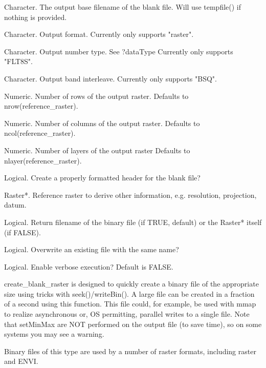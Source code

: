 \documentclass[a4paper]{book}
\begin{document}
\begin{Arguments}
\begin{ldescription}
\item[\code{filename}] Character. The output base filename of
the blank file.  Will use tempfile() if nothing is
provided.

\item[\code{format}] Character.  Output format.  Currently only
supports "raster".

\item[\code{dataType}] Character.  Output number type.  See
?dataType Currently only supports "FLT8S".

\item[\code{bandorder}] Character.  Output band interleave.
Currently only supports "BSQ".

\item[\code{nrow}] Numeric. Number of rows of the output raster.
Defaults to nrow(reference\_raster).

\item[\code{ncol}] Numeric. Number of columns of the output
raster. Defaults to ncol(reference\_raster).

\item[\code{nlayers}] Numeric. Number of layers of the output
raster Defaults to nlayer(reference\_raster).

\item[\code{create\_header}] Logical. Create a properly formatted
header for the blank file?

\item[\code{reference\_raster}] Raster*. Reference raster to
derive other information, e.g. resolution, projection,
datum.

\item[\code{return\_filename}] Logical. Return filename of the
binary file (if TRUE, default) or the Raster* itself (if
FALSE).

\item[\code{overwrite}] Logical. Overwrite an existing file with
the same name?

\item[\code{verbose}] Logical. Enable verbose execution? Default
is FALSE.
\end{ldescription}
\end{Arguments}
%
\begin{Details}\relax
create\_blank\_raster is designed to quickly create a
binary file of the appropriate size using tricks with
seek()/writeBin(). A large file can be created in a
fraction of a second using this function. This file
could, for example, be used with mmap to realize
asynchronous or, OS permitting, parallel writes to a
single file.  Note that setMinMax are NOT performed on
the output file (to save time), so on some systems you
may see a warning.

Binary files of this type are used by a number of raster
formats, including raster and ENVI.
\end{Details}
\end{document}
